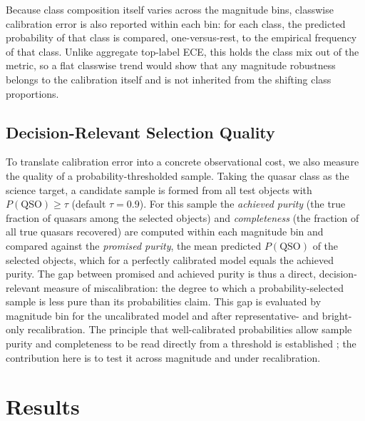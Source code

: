 \documentclass[conference]{IEEEtran}
\begin{document}
Because class composition itself varies across the magnitude bins, classwise calibration error is also reported within each bin: for each class, the predicted probability of that class is compared, one-versus-rest, to the empirical frequency of that class. Unlike aggregate top-label ECE, this holds the class mix out of the metric, so a flat classwise trend would show that any magnitude robustness belongs to the calibration itself and is not inherited from the shifting class proportions.

\subsection{Decision-Relevant Selection Quality}
To translate calibration error into a concrete observational cost, we also measure the quality of a probability-thresholded sample. Taking the quasar class as the science target, a candidate sample is formed from all test objects with $P(\mathrm{QSO}) \geq \tau$ (default $\tau=0.9$). For this sample the \emph{achieved purity} (the true fraction of quasars among the selected objects) and \emph{completeness} (the fraction of all true quasars recovered) are computed within each magnitude bin and compared against the \emph{promised purity}, the mean predicted $P(\mathrm{QSO})$ of the selected objects, which for a perfectly calibrated model equals the achieved purity. The gap between promised and achieved purity is thus a direct, decision-relevant measure of miscalibration: the degree to which a probability-selected sample is less pure than its probabilities claim. This gap is evaluated by magnitude bin for the uncalibrated model and after representative- and bright-only recalibration. The principle that well-calibrated probabilities allow sample purity and completeness to be read directly from a threshold is established \cite{r11}; the contribution here is to test it across magnitude and under recalibration.

\section{Results}\label{sec:results}
\end{document}
